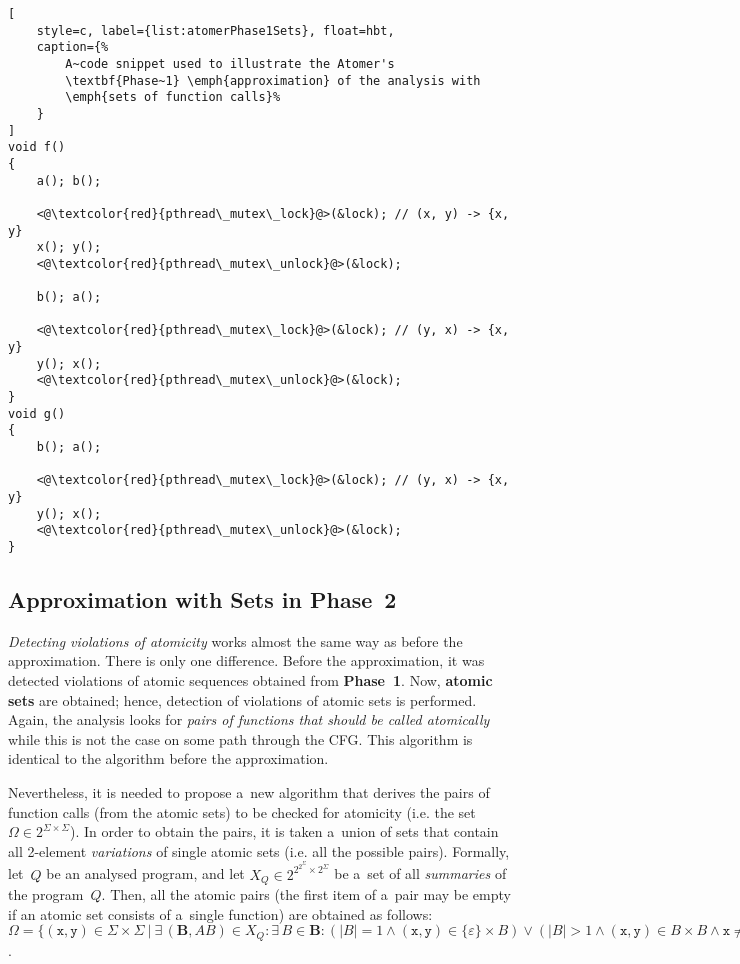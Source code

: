\begin{lstlisting}[
    style=c, label={list:atomerPhase1Sets}, float=hbt,
    caption={%
        A~code snippet used to illustrate the Atomer's
        \textbf{Phase~1} \emph{approximation} of the analysis with
        \emph{sets of function calls}%
    }
]
void f()
{
    a(); b();

    <@\textcolor{red}{pthread\_mutex\_lock}@>(&lock); // (x, y) -> {x, y}
    x(); y();
    <@\textcolor{red}{pthread\_mutex\_unlock}@>(&lock);
    
    b(); a();

    <@\textcolor{red}{pthread\_mutex\_lock}@>(&lock); // (y, x) -> {x, y}
    y(); x();
    <@\textcolor{red}{pthread\_mutex\_unlock}@>(&lock);
}
void g()
{
    b(); a();

    <@\textcolor{red}{pthread\_mutex\_lock}@>(&lock); // (y, x) -> {x, y}
    y(); x();
    <@\textcolor{red}{pthread\_mutex\_unlock}@>(&lock);
}
\end{lstlisting}

\subsection{Approximation with Sets in Phase~2}

\emph{Detecting violations of atomicity} works almost the same way as
before the approximation. There is only one difference. Before the
approximation, it was detected violations of atomic sequences obtained
from \textbf{Phase~1}. Now, \textbf{atomic sets} are obtained; hence,
detection of violations of atomic sets is performed. Again, the analysis
looks for \emph{pairs of functions that should be called atomically} while
this is not the case on some path through the CFG. This algorithm is
identical to the algorithm before the approximation.

Nevertheless, it is needed to propose a~new algorithm that derives the
pairs of function calls (from the atomic sets) to be checked for atomicity
(i.e. the set~$ \Omega \in 2^{\Sigma \times \Sigma} $). In order to obtain the
pairs, it is taken a~union of sets that contain all 2-element \emph{variations}
of single atomic sets (i.e. all the possible pairs). Formally, let~$ Q $ be
an analysed program, and let $ X_Q \in 2^{2^{2^\Sigma} \times 2^\Sigma} $ be
a~set of all \emph{summaries} of the program~$ Q $. Then, all the atomic pairs
(the first item of a~pair may be empty if an atomic set consists of a~single
function) are obtained as follows: $ \Omega = \{{(\mathtt{x}, \mathtt{y})}
\in \Sigma \times \Sigma\ |\ \exists\,{(\boldsymbol{B}, AB)} \in X_Q :
\exists\,B \in \boldsymbol{B} : (|B| = 1 \wedge {(\mathtt{x}, \mathtt{y})} \in
\{\varepsilon\} \times B) \vee (|B| > 1 \wedge {(\mathtt{x}, \mathtt{y})} \in
B \times B \wedge \mathtt{x} \neq \mathtt{y})\} $.

